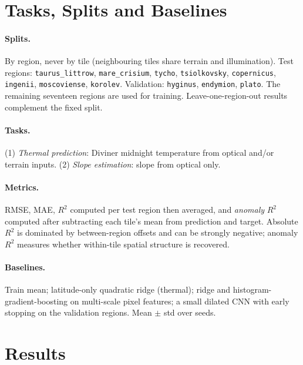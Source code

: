 \documentclass[10pt]{article}
\begin{document}
\section{Tasks, Splits and Baselines}
\paragraph{Splits.}
By region, never by tile (neighbouring tiles share terrain and illumination).
Test regions: \texttt{taurus\_littrow}, \texttt{mare\_crisium}, \texttt{tycho},
\texttt{tsiolkovsky}, \texttt{copernicus}, \texttt{ingenii},
\texttt{moscoviense}, \texttt{korolev}. Validation: \texttt{hyginus},
\texttt{endymion}, \texttt{plato}. The remaining seventeen regions are used for
training. Leave-one-region-out results
complement the fixed split.
\paragraph{Tasks.}
(1) \emph{Thermal prediction}: Diviner midnight temperature from optical
and/or terrain inputs. (2) \emph{Slope estimation}: slope from optical only.
\paragraph{Metrics.}
RMSE, MAE, $R^2$ computed per test region then averaged, and \emph{anomaly}
$R^2$ computed after subtracting each tile's mean from prediction and target.
Absolute $R^2$ is dominated by between-region offsets and can be strongly
negative; anomaly $R^2$ measures whether within-tile spatial structure is
recovered.
\paragraph{Baselines.}
Train mean; latitude-only quadratic ridge (thermal); ridge and
histogram-gradient-boosting on multi-scale pixel features; a small dilated
CNN with early stopping on the validation regions. Mean $\pm$ std over seeds.

\section{Results}
\begin{table}[H]\centering\small

\caption{Thermal prediction on held-out regions (K).}\label{tab:thermal}
\end{table}
\begin{table}[H]\centering\small

\caption{Slope estimation from optical imagery (deg).}\label{tab:slope}
\end{table}
\end{document}
